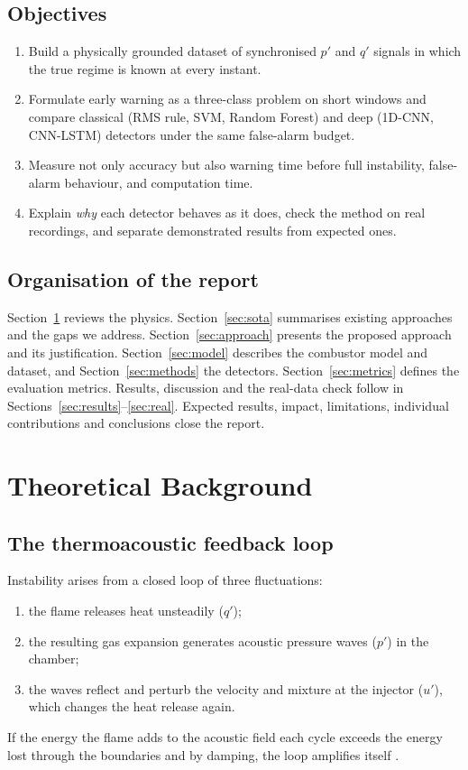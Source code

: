\documentclass[11pt,a4paper]{article}
\newcommand{\pp}{p'}
\newcommand{\qq}{q'}
\begin{document}
\subsection{Objectives}
\begin{enumerate}
  \item Build a physically grounded dataset of synchronised $\pp$ and $\qq$ signals in which the true regime is known at every instant.
  \item Formulate early warning as a three-class problem on short windows and compare classical (RMS rule, SVM, Random Forest) and deep (1D-CNN, CNN-LSTM) detectors under the same false-alarm budget.
  \item Measure not only accuracy but also warning time before full instability, false-alarm behaviour, and computation time.
  \item Explain \emph{why} each detector behaves as it does, check the method on real recordings, and separate demonstrated results from expected ones.
\end{enumerate}

\subsection{Organisation of the report}
Section~\ref{sec:theory} reviews the physics. Section~\ref{sec:sota} summarises existing approaches and the gaps we address. Section~\ref{sec:approach} presents the proposed approach and its justification. Section~\ref{sec:model} describes the combustor model and dataset, and Section~\ref{sec:methods} the detectors. Section~\ref{sec:metrics} defines the evaluation metrics. Results, discussion and the real-data check follow in Sections~\ref{sec:results}--\ref{sec:real}. Expected results, impact, limitations, individual contributions and conclusions close the report.

\section{Theoretical Background}\label{sec:theory}

\subsection{The thermoacoustic feedback loop}
Instability arises from a closed loop of three fluctuations:
\begin{enumerate}
  \item the flame releases heat unsteadily ($\qq$);
  \item the resulting gas expansion generates acoustic pressure waves ($\pp$) in the chamber;
  \item the waves reflect and perturb the velocity and mixture at the injector ($u'$), which changes the heat release again.
\end{enumerate}
If the energy the flame adds to the acoustic field each cycle exceeds the energy lost through the boundaries and by damping, the loop amplifies itself \cite{lieuwen2005,juniper2018}.
\end{document}
